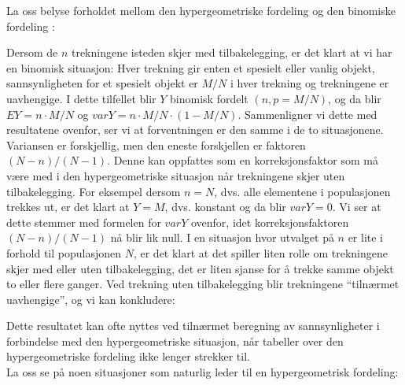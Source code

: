 La oss belyse forholdet mellom den hypergeometriske fordeling og den
binomiske fordeling :

Dersom de $n$ trekningene isteden skjer med tilbakelegging, er det
klart at vi har en binomisk situasjon: Hver trekning gir enten et
spesielt eller vanlig objekt, sannsynligheten for et spesielt
objekt er $M/N$ i hver trekning og trekningene er uavhengige. I
dette tilfellet blir $Y$ binomisk fordelt $(n, p=M/N)$, og da
blir $EY=n\cdot M/N$ og $varY=n\cdot M/N\cdot (1-M/N)$.
Sammenligner vi dette med resultatene ovenfor, ser vi at
forventningen er den samme i de to situasjonene. Variansen er
forskjellig, men den eneste forskjellen er faktoren $(N-n)/(N-1)$.
Denne kan oppfattes som en korreksjonsfaktor som må være med i
den hypergeometriske situasjon når trekningene skjer uten
tilbakelegging. For eksempel dersom $n=N$, dvs. alle elementene i
populasjonen trekkes ut, er det klart at $Y=M$, dvs. konstant og
da blir $varY=0$. Vi ser at dette stemmer med formelen for $varY$
ovenfor, idet korreksjonsfaktoren $(N-n)/(N-1)$ nå blir lik null.
I en situasjon hvor utvalget på $n$ er lite i forhold til
populasjonen $N$, er det klart at det spiller liten rolle om
trekningene skjer med eller uten tilbakelegging, det er liten
sjanse for å trekke samme objekt to eller flere ganger. Ved
trekning uten tilbakelegging blir trekningene ``tilnærmet
uavhengige'', og vi kan konkludere:

\begin{center}  \end{center} 

\noindent Dette resultatet kan ofte nyttes ved tilnærmet beregning av
sannsynligheter i forbindelse med den hypergeometriske situasjon,
når tabeller over den hypergeometriske fordeling ikke lenger
strekker til. \\

La oss se på noen situasjoner som naturlig leder til en
hypergeometrisk fordeling: \\

